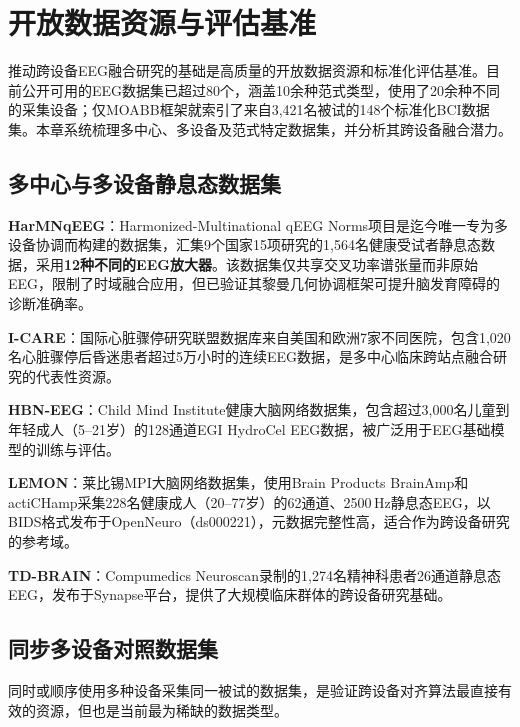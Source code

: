 \documentclass[12pt, a4paper]{article}
\begin{document}
\section{开放数据资源与评估基准}
\label{sec:datasets}

推动跨设备EEG融合研究的基础是高质量的开放数据资源和标准化评估基准。目前公开可用的EEG数据集已超过80个，涵盖10余种范式类型，使用了20余种不同的采集设备；仅MOABB框架就索引了来自3,421名被试的148个标准化BCI数据集\citep{Chevallier2024MOABB}。本章系统梳理多中心、多设备及范式特定数据集，并分析其跨设备融合潜力。

\subsection{多中心与多设备静息态数据集}

\textbf{HarMNqEEG}：Harmonized-Multinational qEEG Norms项目\citep{Li2022HarMNqEEG}是迄今唯一专为多设备协调而构建的数据集，汇集9个国家15项研究的1,564名健康受试者静息态数据，采用\textbf{12种不同的EEG放大器}。该数据集仅共享交叉功率谱张量而非原始EEG，限制了时域融合应用，但已验证其黎曼几何协调框架可提升脑发育障碍的诊断准确率。

\textbf{I-CARE}：国际心脏骤停研究联盟数据库\citep{ICARE2023}来自美国和欧洲7家不同医院，包含1,020名心脏骤停后昏迷患者超过5万小时的连续EEG数据，是多中心临床跨站点融合研究的代表性资源。

\textbf{HBN-EEG}：Child Mind Institute健康大脑网络数据集\citep{Alexander2017HBN}，包含超过3,000名儿童到年轻成人（5--21岁）的128通道EGI HydroCel EEG数据，被广泛用于EEG基础模型的训练与评估。

\textbf{LEMON}：莱比锡MPI大脑网络数据集\citep{Babayan2019LEMON}，使用Brain Products BrainAmp和actiCHamp采集228名健康成人（20--77岁）的62通道、2500\,Hz静息态EEG，以BIDS格式发布于OpenNeuro（ds000221），元数据完整性高，适合作为跨设备研究的参考域。

\textbf{TD-BRAIN}：Compumedics Neuroscan录制的1,274名精神科患者26通道静息态EEG\citep{vanDijk2022TDBRAIN}，发布于Synapse平台，提供了大规模临床群体的跨设备研究基础。

\subsection{同步多设备对照数据集}

同时或顺序使用多种设备采集同一被试的数据集，是验证跨设备对齐算法最直接有效的资源，但也是当前最为稀缺的数据类型。
\end{document}
